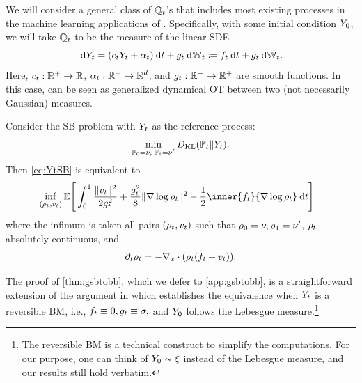 We will consider a general class of $\refpro$'s that includes most existing processes in the machine learning applications of . Specifically, with some initial condition $\refsde[0]$, we will take $\refpro$ to be the measure of the linear \acrlong{SDE}
\begin{equation}
\label{eq:linearsde}
\drefsde = \parens*{\drift \refsde  + \shift }\dd t + \volat \dWiener[\ctime] \defeq \driftf\dt + \volat \dWiener[\ctime].
\end{equation}
Here, $\drift: \R^+ \to \R$, $\shift : \R^+ \to \R^\vdim$, and $\volat: \R^+ \to \R^+$ are smooth functions. In this case,  can be seen as generalized dynamical \acrshort{OT} between two (not necessarily Gaussian) measures.
\begin{theorem}
\label{thm:gsbtobb}
Consider the \acrlong{SB} problem with $\refsde$ as the reference process: 
\begin{equation}
\label{eq:YtSB}
\min_{ \substack{ \Pinit = \nu, \; \Pend = \nu'} } \KL(\Pmargin \|\refsde).%
\end{equation}
Then \eqref{eq:YtSB} is equivalent to
\begin{align}
\label{eq:dynamicGSB}
&\inf_{(\measure,\vect)} \mathbb{E}\Bigg[\int_0^\horizon  \frac{\norm{\vect}^2}{2\volatsq[\ctime]} + \frac{\volatsq[\ctime]}{8} \norm{\nabla \log \measure}^2  - \frac{1}{2} \inner{\driftf}{\nabla \log\measure} \dt\Bigg]
\end{align}where the infimum is taken all pairs $(\measure,\vect)$ such that $\measure[0] = \nu, \measure[\horizon] = \nu'$, $\measure$ absolutely continuous, and
\begin{align}
\label{eq:Coneq2}
\partial_t \measure = -\Div \parens*{  \measure\parens*{ \driftf + \vect}  }.
\end{align}
\end{theorem}
The proof of \cref{thm:gsbtobb}, which we defer to \cref{app:gsbtobb}, is a straightforward extension of the argument in \citep{leonard2013survey, chen2016relation, gentil2017analogy} which establishes the equivalence when $\refsde$ is a reversible \acrlong{BM}, i.e., $\driftf \equiv0, \volat[\ctime] \equiv \sigma,$ and $\refsde[0]$ follows the Lebesgue measure.\footnote{The reversible \acrlong{BM} is a technical construct to simplify the computations. For our purpose, one can think of $\refsde[0]\sim \xi$ instead of the Lebesgue measure, and our results still hold verbatim.}  


